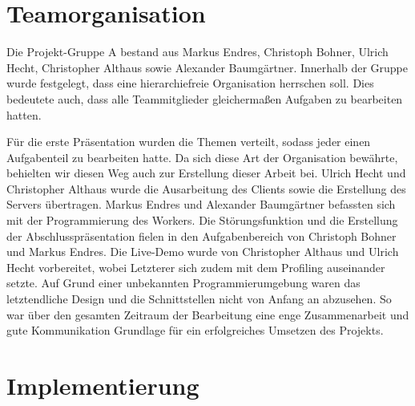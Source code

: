 \documentclass[10pt,a4paper]{article}
\begin{document}
\section{Teamorganisation}	%
Die Projekt-Gruppe A bestand aus Markus Endres, Christoph Bohner, Ulrich Hecht, Christopher Althaus sowie Alexander Baumgärtner. Innerhalb der Gruppe wurde festgelegt, dass eine hierarchiefreie Organisation herrschen soll. Dies bedeutete auch, dass alle Teammitglieder gleichermaßen Aufgaben zu bearbeiten hatten. 

Für die erste Präsentation wurden die Themen verteilt, sodass jeder einen Aufgabenteil zu bearbeiten hatte. Da sich diese Art der Organisation bewährte, behielten wir diesen Weg auch zur Erstellung dieser Arbeit bei. Ulrich Hecht und Christopher Althaus wurde die Ausarbeitung des Clients sowie die Erstellung des Servers übertragen. Markus Endres und Alexander Baumgärtner befassten sich mit der Programmierung des Workers. Die Störungsfunktion und die Erstellung der Abschlusspräsentation fielen in den Aufgabenbereich von Christoph Bohner und Markus Endres. Die Live-Demo wurde von Christopher Althaus und Ulrich Hecht vorbereitet, wobei Letzterer sich zudem mit dem Profiling auseinander setzte.  Auf Grund einer unbekannten Programmierumgebung waren das letztendliche Design und die Schnittstellen nicht von Anfang an abzusehen. So war über den gesamten Zeitraum der Bearbeitung eine enge Zusammenarbeit und gute Kommunikation Grundlage für ein erfolgreiches Umsetzen des Projekts.
\section{Implementierung}


%
%
%
\end{document}
